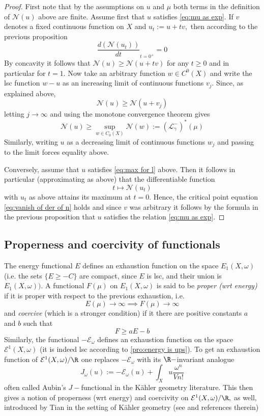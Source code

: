 \documentclass[11pt,oneside,english]{amsart}
\numberwithin{equation}{section}
\numberwithin{figure}{section}
\theoremstyle{plain}
\theoremstyle{plain}
\theoremstyle{plain}
\theoremstyle{plain}
\theoremstyle{remark}
\theoremstyle{definition}
\begin{document}
\begin{proof}
First note that by the assumptions on $u$ and $\mu$ both terms in
the definition of $\mathcal{N}(u)$ above are finite. Assume first
that $u$ satisfies \ref{eq:mu as exp}. If $v$ denotes a fixed continuous
function on $X$ and $u_{t}:=u+tv,$ then according to the previous
proposition 
\begin{equation}
\frac{d(\mathcal{N}(u_{t}))}{dt}_{t=0^{+}}=0\label{eq:vanish of der of n}
\end{equation}
 By concavity it follows that $\mathcal{N}(u)\geq\mathcal{N}(u+tv)$
for any $t\geq0$ and in particular for $t=1.$ Now take an arbitrary
function $w\in C^{0}(X)$ and write the lsc function $w-u$ as an
increasing limit of continuous functions $v_{j}.$ Since, as explained
above, 
\[
\mathcal{N}(u)\geq\mathcal{N}(u+v_{j})
\]
 letting $j\rightarrow\infty$ and using the monotone convergence
theorem gives 
\[
\mathcal{N}(u)\geq\sup_{w\in C_{0}(X)}\mathcal{N}(w):=(\mathcal{L}_{\gamma}^{-})^{*}(\mu)
\]
 Similarly, writing $u$ as a decreasing limit of continuous functions
$w_{j}$ and passing to the limit forces equality above.

Conversely, assume that $u$ satisfies \ref{eq:max for l} above.
Then it follows in particular (approximating as above) that the differentiable
function 
\[
t\mapsto\mathcal{N}(u_{t})
\]
 with $u_{t}$ as above attains its maximum at $t=0.$ Hence, the
critical point equation \ref{eq:vanish of der of n} holds and since
$v$ was arbitrary it follows by the formula in the previous proposition
that $u$ satisfies the relation \ref{eq:mu as exp}. 
\end{proof}

\subsection{\label{sub:Properness-and-coercivity}Properness and coercivity of
functionals}

The energy functional $E$ defines an exhaustion function on the space
$E_{1}(X,\omega)$ (i.e. the sets $\{E\geq-C\}$ are compact, since
$E$ is lsc, and their union is $E_{1}(X,\omega)).$ A functional
$F(\mu)$ on $E_{1}(X,\omega)$ is said to be \emph{proper (wrt energy)
}if it is proper with respect to the previous exhaustion, i.e. 
\[
E(\mu)\rightarrow\infty\implies F(\mu)\rightarrow\infty
\]
 and\emph{ coercive} (which is a stronger condition) if it there are
positive constants $a$ and $b$ such that 
\[
F\geq aE-b
\]
 Similarly, the functional $-\mathcal{E}_{\omega}$ defines an exhaustion
function on the space $\mathcal{E}^{1}(X,\omega)$ (it is indeed lsc
according to \ref{pro:energy is ups}). To get an exhaustion function
of $\mathcal{E}^{1}(X,\omega)/\R$ one replaces $-\mathcal{E}_{\omega}$
with its $\R-$invariant analogue 
\[
J_{\omega}(u):=-\mathcal{E}_{\omega}(u)+\int_{X}u\frac{\omega^{n}}{Vn!}
\]
 often called Aubin's $J-$functional in the Kähler geometry literature.
This then gives a notion of properness (wrt energy) and coercivity
on $\mathcal{E}^{1}(X,\omega)/\R,$ as well, introduced by Tian in
the setting of Kähler geometry (see \cite{ti} and references therein)
\end{document}
